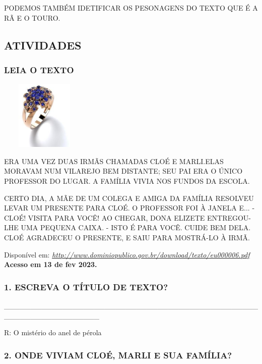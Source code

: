PODEMOS TAMBÉM IDETIFICAR OS PESONAGENS DO TEXTO QUE É A RÃ E O
TOURO.\protect\hypertarget{_heading=h.nmjmay4k137u}{}{}

\subsection{ATIVIDADES}\label{atividades-4}

\subsubsection{LEIA O TEXTO}\label{leia-o-texto-1}

\includegraphics[width=1.66667in,height=1.30208in]{media/image163.jpg}

ERA UMA VEZ DUAS IRMÃS CHAMADAS CLOÉ E MARLI.ELAS MORAVAM NUM VILAREJO
BEM DISTANTE; SEU PAI ERA O ÚNICO PROFESSOR DO LUGAR. A FAMÍLIA VIVIA
NOS FUNDOS DA ESCOLA.

CERTO DIA, A MÃE DE UM COLEGA E AMIGA DA FAMÍLIA RESOLVEU LEVAR UM
PRESENTE PARA CLOÉ. O PROFESSOR FOI À JANELA E... - CLOÉ! VISITA PARA
VOCÊ! AO CHEGAR, DONA ELIZETE ENTREGOU-LHE UMA PEQUENA CAIXA. - ISTO É
PARA VOCÊ. CUIDE BEM DELA. CLOÉ AGRADECEU O PRESENTE, E SAIU PARA
MOSTRÁ-LO À IRMÃ.

Disponível em:
\href{http://www.dominiopublico.gov.br/download/texto/eu000006.pdf}{\emph{http://www.dominiopublico.gov.br/download/texto/eu000006.pdf}}
\textbf{Acesso em 13 de fev 2023.}

\subsubsection{1. ESCREVA O TÍTULO DE
TEXTO?}\label{escreva-o-tuxedtulo-de-texto}

\_\_\_\_\_\_\_\_\_\_\_\_\_\_\_\_\_\_\_\_\_\_\_\_\_\_\_\_\_\_\_\_\_\_\_\_\_\_\_\_\_\_\_\_\_\_\_\_\_\_\_\_\_\_\_\_\_\_\_\_\_\_\_\_\_\_

R: O mistério do anel de pérola

\subsubsection{2. ONDE VIVIAM CLOÉ, MARLI E SUA
FAMÍLIA?}\label{onde-viviam-clouxe9-marli-e-sua-famuxedlia}

